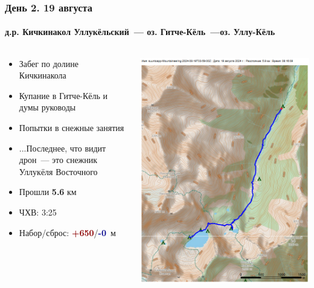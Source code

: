 	\begin{frame}
	\frametitle{День 2. 19 августа}
	\framesubtitle{д.р. Кичкинакол Уллукёльский~--- оз. Гитче-Кёль~---оз. Уллу-Кёль} %
	\begin{columns}[c] %
		\begin{column}{0.45\textwidth} %
			\begin{itemize}
				\item Забег по долине Кичкинакола
				\item Купание в Гитче-Кёль и думы руководы
				\item Попытки в снежные занятия
				\item ...Последнее, что видит дрон~--- это снежник Уллукёля Восточного \frownie
				\item Прошли \textbf{5.6} км
				\item ЧХВ: 3:25
				\item Набор/сброс: \textcolor{darkred}{\textbf{+650}}/\textcolor{darkblue}{\textbf{-0}}~м
			\end{itemize}
			
		\end{column}
		\begin{column}{0.5\textwidth} %
			\centering
			\includegraphics[width=\linewidth]{../pics/mini_maps/19}
		\end{column}
	\end{columns}
\end{frame}


